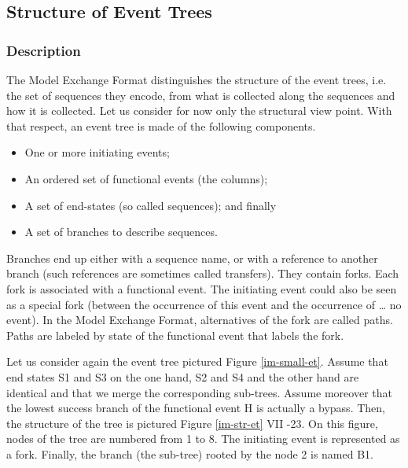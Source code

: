 \documentclass[11pt]{article}
\begin{document}
\subsection{Structure of Event Trees}
\label{sec:orga71c6b1}



\subsubsection{Description}
\label{sec:org7bc2b38}

The Model Exchange Format distinguishes the structure of the event
trees, i.e. the set of sequences they encode, from what is collected
along the sequences and how it is collected. Let us consider for now
only the structural view point. With that respect, an event tree is made
of the following components.

\begin{itemize}
\item One or more initiating events;

\item An ordered set of functional events (the columns);

\item A set of end-states (so called sequences); and finally

\item A set of branches to describe sequences.
\end{itemize}

Branches end up either with a sequence name, or with a reference to
another branch (such references are sometimes called transfers). They
contain forks. Each fork is associated with a functional event. The
initiating event could also be seen as a special fork (between the
occurrence of this event and the occurrence of \ldots{} no event). In the
Model Exchange Format, alternatives of the fork are called paths. Paths
are labeled by state of the functional event that labels the fork.

Let us consider again the event tree pictured Figure \ref{im-small-et}. Assume
that end states S1 and S3 on the one hand, S2 and S4 and the other hand
are identical and that we merge the corresponding sub-trees. Assume
moreover that the lowest success branch of the functional event H is
actually a bypass. Then, the structure of the tree is pictured Figure \ref{im-str-et}
VII -23. On this figure, nodes of the tree are numbered from 1 to 8. The
initiating event is represented as a fork. Finally, the branch (the
sub-tree) rooted by the node 2 is named B1.
\end{document}
